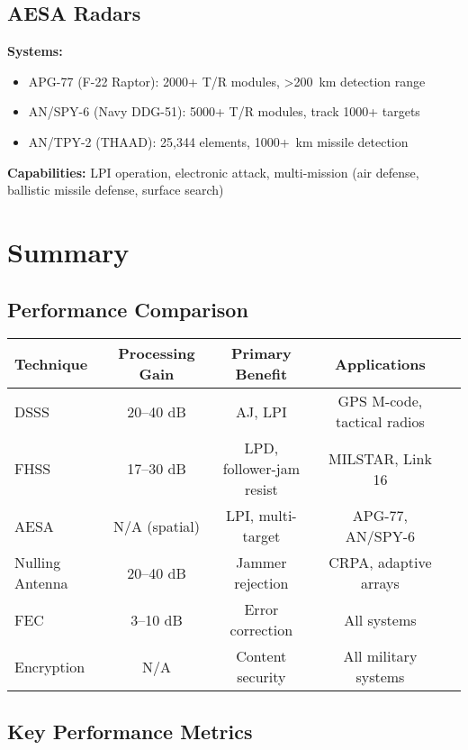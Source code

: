\subsection{AESA Radars}

\textbf{Systems:}
\begin{itemize}
\item APG-77 (F-22 Raptor): 2000+ T/R modules, >200~km detection range
\item AN/SPY-6 (Navy DDG-51): 5000+ T/R modules, track 1000+ targets
\item AN/TPY-2 (THAAD): 25,344 elements, 1000+~km missile detection
\end{itemize}

\textbf{Capabilities:} LPI operation, electronic attack, multi-mission (air defense, ballistic missile defense, surface search)

\section{Summary}

\subsection{Performance Comparison}

\begin{center}
\begin{tabular}{lcccc}
\toprule
\textbf{Technique} & \textbf{Processing Gain} & \textbf{Primary Benefit} & \textbf{Applications} \\
\midrule
DSSS & 20--40 dB & AJ, LPI & GPS M-code, tactical radios \\
FHSS & 17--30 dB & LPD, follower-jam resist & MILSTAR, Link 16 \\
AESA & N/A (spatial) & LPI, multi-target & APG-77, AN/SPY-6 \\
Nulling Antenna & 20--40 dB & Jammer rejection & CRPA, adaptive arrays \\
FEC & 3--10 dB & Error correction & All systems \\
Encryption & N/A & Content security & All military systems \\
\bottomrule
\end{tabular}
\end{center}

\subsection{Key Performance Metrics}

